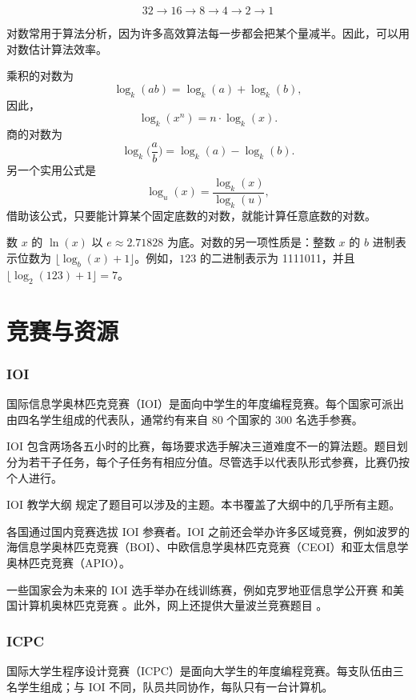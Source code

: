 \[32 \rightarrow 16 \rightarrow 8 \rightarrow 4 \rightarrow 2 \rightarrow 1 \]

对数常用于算法分析，因为许多高效算法每一步都会把某个量减半。因此，可以用对数估计算法效率。

乘积的对数为
\[\log_k(ab) = \log_k(a)+\log_k(b),\]
因此，
\[\log_k(x^n) = n \cdot \log_k(x).\]
商的对数为
\[\log_k\Big(\frac{a}{b}\Big) = \log_k(a)-\log_k(b).\]
另一个实用公式是
\[\log_u(x) = \frac{\log_k(x)}{\log_k(u)},\]
借助该公式，只要能计算某个固定底数的对数，就能计算任意底数的对数。


数 $x$ 的 $\ln(x)$ 以 $e \approx 2.71828$ 为底。对数的另一项性质是：整数 $x$ 的 $b$ 进制表示位数为 $\lfloor \log_b(x)+1 \rfloor$。例如，$123$ 的二进制表示为 1111011，并且 $\lfloor \log_2(123)+1 \rfloor = 7$。

\section{竞赛与资源}

\subsubsection{IOI}

国际信息学奥林匹克竞赛（IOI）是面向中学生的年度编程竞赛。每个国家可派出由四名学生组成的代表队，通常约有来自 80 个国家的 300 名选手参赛。

IOI 包含两场各五小时的比赛，每场要求选手解决三道难度不一的算法题。题目划分为若干子任务，每个子任务有相应分值。尽管选手以代表队形式参赛，比赛仍按个人进行。

IOI 教学大纲 \cite{iois} 规定了题目可以涉及的主题。本书覆盖了大纲中的几乎所有主题。

各国通过国内竞赛选拔 IOI 参赛者。IOI 之前还会举办许多区域竞赛，例如波罗的海信息学奥林匹克竞赛（BOI）、中欧信息学奥林匹克竞赛（CEOI）和亚太信息学奥林匹克竞赛（APIO）。

一些国家会为未来的 IOI 选手举办在线训练赛，例如克罗地亚信息学公开赛 \cite{coci} 和美国计算机奥林匹克竞赛 \cite{usaco}。此外，网上还提供大量波兰竞赛题目 \cite{main}。

\subsubsection{ICPC}

国际大学生程序设计竞赛（ICPC）是面向大学生的年度编程竞赛。每支队伍由三名学生组成；与 IOI 不同，队员共同协作，每队只有一台计算机。

